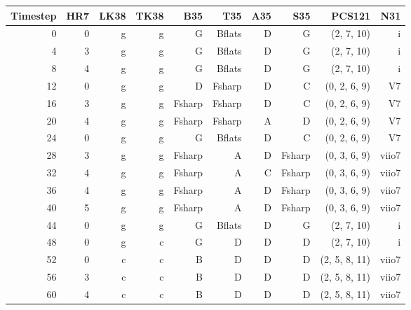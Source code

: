 \begin{tabular}{r|rrrrrrrrr}
    Timestep & HR7 & LK38 & TK38 & B35          & T35          & A35         & S35          & PCS121        & N31   \\ \hline
0        & 0   & g    & g    & G            & B\glspl{flat}  & D           & G            & (2, 7, 10)    & i     \\
4        & 3   & g    & g    & G            & B\glspl{flat}  & D           & G            & (2, 7, 10)    & i     \\
8        & 4   & g    & g    & G            & B\glspl{flat}  & D           & G            & (2, 7, 10)    & i     \\
12       & 0   & g    & g    & D            & F\gls{sharp} & D           & C            & (0, 2, 6, 9)  & V7    \\
16       & 3   & g    & g    & F\gls{sharp} & F\gls{sharp} & D           & C            & (0, 2, 6, 9)  & V7    \\
20       & 4   & g    & g    & F\gls{sharp} & F\gls{sharp} & A           & D            & (0, 2, 6, 9)  & V7    \\ \hline
24       & 0   & g    & g    & G            & B\glspl{flat}  & D           & C            & (0, 2, 6, 9)  & V7    \\
28       & 3   & g    & g    & F\gls{sharp} & A            & D           & F\gls{sharp} & (0, 3, 6, 9)  & viio7 \\
32       & 4   & g    & g    & F\gls{sharp} & A            & C           & F\gls{sharp} & (0, 3, 6, 9)  & viio7 \\
36       & 4   & g    & g    & F\gls{sharp} & A            & D           & F\gls{sharp} & (0, 3, 6, 9)  & viio7 \\
40       & 5   & g    & g    & F\gls{sharp} & A            & D           & F\gls{sharp} & (0, 3, 6, 9)  & viio7 \\
44       & 0   & g    & g    & G            & B\glspl{flat}  & D           & G            & (2, 7, 10)    & i     \\ \hline
48       & 0   & g    & c    & G            & D            & D           & D            & (2, 7, 10)    & i     \\
52       & 0   & c    & c    & B            & D            & D           & D            & (2, 5, 8, 11) & viio7 \\
56       & 3   & c    & c    & B            & D            & D           & D            & (2, 5, 8, 11) & viio7 \\
60       & 4   & c    & c    & B            & D            & D           & D            & (2, 5, 8, 11) & viio7 \\

\end{tabular}
